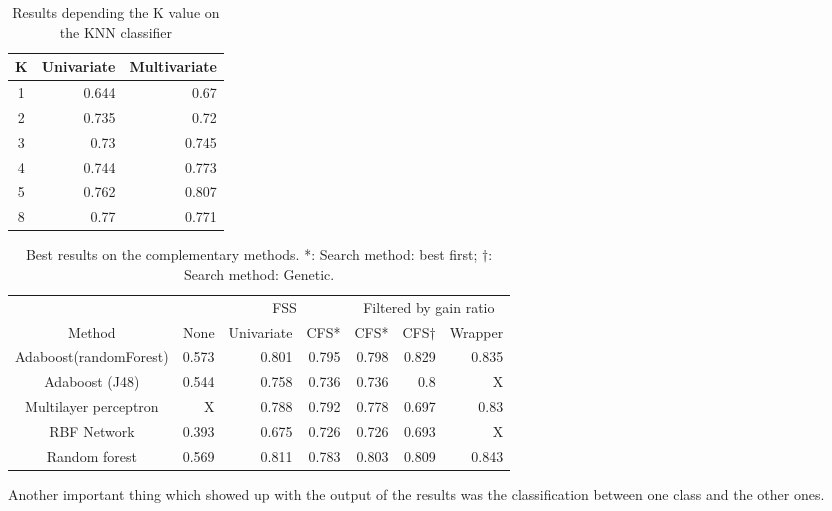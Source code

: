 \documentclass[conference,a4paper]{IEEEtran}
\begin{document}
\begin{table}[h]
	\caption{Results depending the K value on the KNN classifier}
	\centering
	\begin{tabular}{c r r}
		\hline\hline
		K & Univariate & Multivariate\\ [0.2ex]
		\hline
		1 & 0.644 & 0.67\\
		2 & 0.735 & 0.72\\
		3 & 0.73 & 0.745\\
		4 & 0.744 & 0.773\\
		5 & 0.762 & 0.807\\
		8 & 0.77 & 0.771 \\ [1ex]
		\hline
	\end{tabular}
	\label{table:knnResults}
\end{table}

\begin{table}[h]
	\caption{Best results on the complementary methods. *: Search method: best first; $\dagger$: Search method: Genetic.}
	\centering
	\begin{tabular}{c r r r r r r}
		\hline\hline
		& & \multicolumn{2}{c|}{FSS} & \multicolumn{3}{c}{Filtered by gain ratio}\\
		Method& None& Univariate& \multicolumn{1}{c|}{CFS*}& CFS*& CFS$\dagger$ & Wrapper\\ [0.2ex]
		\hline
		Adaboost(randomForest) & 0.573 & 0.801 & 0.795 & 0.798& 0.829 & 0.835 \\
		Adaboost (J48) & 0.544 & 0.758 & 0.736 & 0.736 & 0.8 & X \\
		Multilayer perceptron & X & 0.788 & 0.792 & 0.778 & 0.697 & 0.83 \\
		RBF Network & 0.393 & 0.675 & 0.726 & 0.726 & 0.693 & X\\
		Random forest & 0.569 & 0.811 & 0.783 & 0.803 & 0.809 & 0.843 \\ [1ex]
		\hline
	\end{tabular}
	\label{table:complementaryResults}
\end{table}

Another important thing which showed up with the output of the results was the classification between one class and the other ones.
\end{document}
